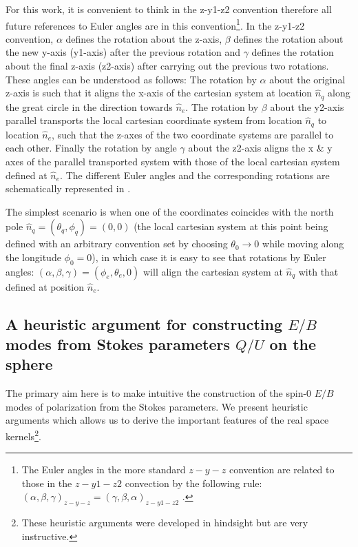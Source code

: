 For this work, it is convenient to think in the z-y1-z2 convention therefore all future references to Euler angles are in this convention\footnote{The Euler angles in the more standard $z-y-z$ convention are related to those in the $z-y1-z2$ convection by the following rule: $(\alpha,\beta,\gamma)_{z-y-z} =(\gamma,\beta,\alpha)_{z-y1-z2}$ \cite{varshalovich}.}.
In the z-y1-z2 convention, $\alpha$ defines the rotation about the z-axis, $\beta$ defines the rotation about the new y-axis (y1-axis) after the previous rotation and $\gamma$ defines the rotation about the final z-axis (z2-axis) after carrying out the previous two rotations. These angles can be understood as follows: The rotation by $\alpha$ about the original z-axis is such that it aligns the x-axis of the cartesian system at location $\hat{n}_q$ along the great circle in the direction  towards $\hat{n}_e$.  The rotation by $\beta$ about the y2-axis parallel transports the local cartesian coordinate system from location $\hat{n}_q$ to location $\hat{n}_e$, such that the z-axes of the two coordinate systems are parallel to each other. Finally the rotation by angle $\gamma$ about the z2-axis aligns the x \& y axes of the parallel transported system with those of the local cartesian system defined at $\hat{n}_e$. The different Euler angles and the corresponding rotations are schematically represented in .

The simplest scenario is when one of the coordinates coincides with the north pole $\hat{n}_q=(\theta_q,\phi_q)=(0,0)$ (the local cartesian system at this point being defined with an arbitrary convention set by choosing $\theta_0 \rightarrow 0$ while moving along the longitude $\phi_0=0$), in which case it is easy to see that rotations by Euler angles: $(\alpha,\beta,\gamma) =(\phi_e,\theta_e,0)$ will align the cartesian system at $\hat{n}_q$ with that defined at position $\hat{n}_e$. 

\subsection{A heuristic argument for constructing  $E/B$ modes from Stokes parameters $Q/U$ on the sphere} \label{sec:qu2eb_heuristic}
The primary aim here is to make intuitive the construction of the spin-0 $E/B$ modes of polarization from the Stokes parameters. We present heuristic arguments which allows us to derive the important features of the real space kernels\footnote{These heuristic arguments were developed in hindsight but are very instructive.}. 

